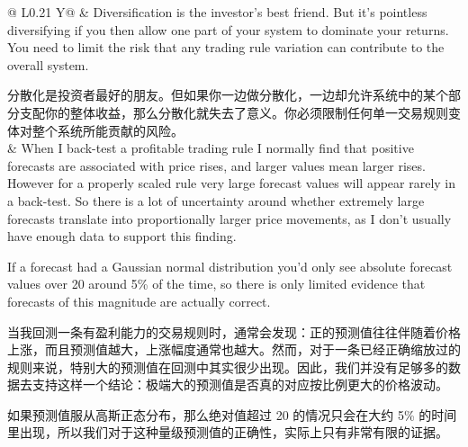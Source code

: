 \begin{bilingualtableblock}
\begingroup
\small
\setlength{\tabcolsep}{5pt}
\renewcommand{\arraystretch}{1.12}
\noindent\begin{breakabletabularx}{\textwidth}{@{} L{0.21\textwidth} Y@{}}
\toprule
\endfirsthead
\toprule
\endhead
\bottomrule
\endfoot
\bottomrule
\endlastfoot
{} & Diversification is the investor's best friend. But it's pointless diversifying if you then allow one part of your system to dominate your returns. You need to limit the risk that any trading rule variation can contribute to the overall system.\par\medskip 分散化是投资者最好的朋友。但如果你一边做分散化，一边却允许系统中的某个部分支配你的整体收益，那么分散化就失去了意义。你必须限制任何单一交易规则变体对整个系统所能贡献的风险。 \\
\midrule
{} & When I back-test a profitable trading rule I normally find that positive forecasts are associated with price rises, and larger values mean larger rises. However for a properly scaled rule very large forecast values will appear rarely in a back-test. So there is a lot of uncertainty around whether extremely large forecasts translate into proportionally larger price movements, as I don't usually have enough data to support this finding.\par If a forecast had a Gaussian normal distribution you'd only see absolute forecast values over 20 around 5\% of the time, so there is only limited evidence that forecasts of this magnitude are actually correct.\par\medskip 当我回测一条有盈利能力的交易规则时，通常会发现：正的预测值往往伴随着价格上涨，而且预测值越大，上涨幅度通常也越大。然而，对于一条已经正确缩放过的规则来说，特别大的预测值在回测中其实很少出现。因此，我们并没有足够多的数据去支持这样一个结论：极端大的预测值是否真的对应按比例更大的价格波动。\par 如果预测值服从高斯正态分布，那么绝对值超过 20 的情况只会在大约 5\% 的时间里出现，所以我们对于这种量级预测值的正确性，实际上只有非常有限的证据。 \\
\midrule

\end{breakabletabularx}
\end{bilingualtableblock}
